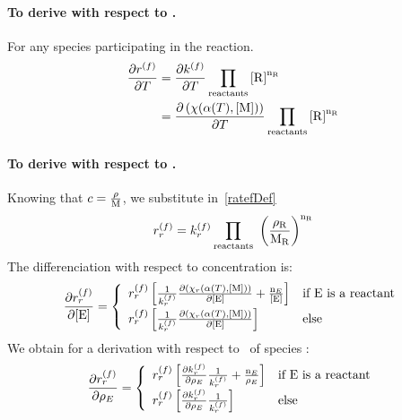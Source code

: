 \paragraph{To derive with respect to \Temp.}
For any species  participating in the reaction.
\begin{equation}
\begin{split}
\doverdT{\fwdrate} & = \doverdT{\fwdratecons} \prodReac \\
                   & = \doverdT{\left(\chemProc\right)} \prodReac \\
\end{split}
\end{equation}

\paragraph{To derive with respect to \mass.}
Knowing that $\conc = \frac{\mass}{\Mm}$, we substitute in~\ref{ratefDef}
\begin{equation}
\fwdrate[r] = \fwdratecons[r] \prod_\text{reactants}  \left(\frac{\mass[\reac]}{\Mm[\reac]}\right)^{\scoefabs[\reac]}
\end{equation}
The differenciation with respect to concentration is:
\begin{equation}
\doverdc[E]{\fwdrate[r]} = \left\{\begin{array}{ll}
                              \fwdrate[r]\left[ \frac{1}{\fwdratecons[r]} \doverdc[E]{\left(\chemProc[r]\right)} + \frac{\scoefabs[E]}{\conc[E]}\right] & \text{if \ce{E} is a reactant} \\[5pt]
                              \fwdrate[r]\left[ \frac{1}{\fwdratecons[r]} \doverdc[E]{\left(\chemProc[r]\right)}\right] & \text{else} \\
                              \end{array}\right.
\end{equation}
We obtain for a derivation with respect to \mass[E]\ of species :
\begin{equation}
\doverdm[E]{\fwdrate[r]} = \left\{\begin{array}{ll}
                             \fwdrate[r] \left[\doverdm[E]{\fwdratecons[r]} \frac{1}{\fwdratecons[r]} + \frac{\scoefabs[E]}{\mass[E]}\right] & \text{if \ce{E} is a reactant} \\[5pt]
                             \fwdrate[r] \left[\doverdm[E]{\fwdratecons[r]} \frac{1}{\fwdratecons[r]}\right] & \text{else} 
                           \end{array}\right.
\end{equation}


